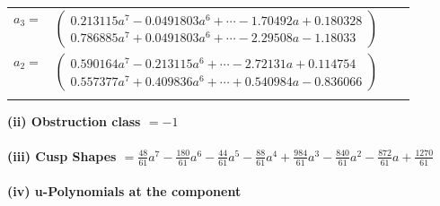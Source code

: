 \documentclass[1p]{elsarticle_modified}
\theoremstyle{definition}
\begin{document}
\begin{tabular}{m{7pt} m{180pt} m{7pt} m{180pt} }
\flushright $a_{3}=$&$\begin{pmatrix}0.213115 a^{7}-0.0491803 a^{6}+\cdots-1.70492 a+0.180328\\0.786885 a^{7}+0.0491803 a^{6}+\cdots-2.29508 a-1.18033\end{pmatrix}$ \\
\flushright $a_{2}=$&$\begin{pmatrix}0.590164 a^{7}-0.213115 a^{6}+\cdots-2.72131 a+0.114754\\0.557377 a^{7}+0.409836 a^{6}+\cdots+0.540984 a-0.836066\end{pmatrix}$\\&\end{tabular}
\flushleft \textbf{(ii) Obstruction class $= -1$}\\~\\
\flushleft \textbf{(iii) Cusp Shapes $= \frac{48}{61} a^7-\frac{180}{61} a^6-\frac{44}{61} a^5-\frac{88}{61} a^4+\frac{984}{61} a^3-\frac{840}{61} a^2-\frac{872}{61} a+\frac{1270}{61}$}\\~\\
\newpage\renewcommand{\arraystretch}{1}
\flushleft \textbf{(iv) u-Polynomials at the component}\newline \\
\end{document}
